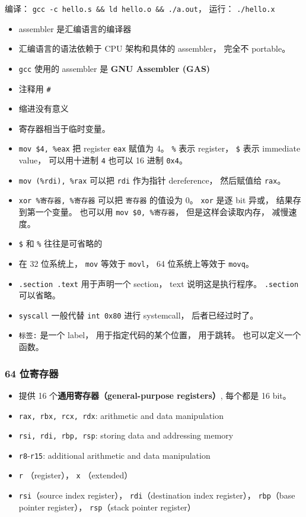 编译： \verb`gcc -c hello.s && ld hello.o && ./a.out`， 运行： \verb`./hello.x`
\begin{itemize}
\item assembler 是汇编语言的编译器
\item 汇编语言的语法依赖于 CPU 架构和具体的 assembler， 完全不 portable。
\item \verb`gcc` 使用的 assembler 是 \textbf{GNU Assembler (GAS)}
\item 注释用 \verb`#`
\item 缩进没有意义
\item 寄存器相当于临时变量。
\item \verb`mov $4, %eax` 把 register \verb`eax` 赋值为 4。 \verb`%` 表示 register， \verb`$` 表示 immediate value， 可以用十进制 \verb`4` 也可以 16 进制 \verb`0x4`。
\item \verb`mov (%rdi), %rax` 可以把 \verb`rdi` 作为指针 dereference， 然后赋值给 \verb`rax`。
\item \verb`xor %寄存器, %寄存器` 可以把 \verb`寄存器` 的值设为 0。 \verb`xor` 是逐 bit 异或， 结果存到第一个变量。 也可以用 \verb`mov $0, %寄存器`， 但是这样会读取内存， 减慢速度。
\item \verb`$` 和 \verb`%` 往往是可省略的
\item 在 32 位系统上， \verb`mov` 等效于 \verb`movl`， 64 位系统上等效于 \verb`movq`。
\item \verb`.section .text` 用于声明一个 section， text 说明这是执行程序。 \verb`.section` 可以省略。
\item \verb`syscall` 一般代替 \verb`int 0x80` 进行 systemcall， 后者已经过时了。
\item \verb`标签:` 是一个 label， 用于指定代码的某个位置， 用于跳转。 也可以定义一个函数。
\end{itemize}

\subsubsection{64 位寄存器}
\begin{itemize}
\item 提供 16 个\textbf{通用寄存器（general-purpose registers）}, 每个都是 16 bit。
\item \verb`rax, rbx, rcx, rdx`: arithmetic and data manipulation
\item \verb`rsi, rdi, rbp, rsp`: storing data and addressing memory
\item \verb`r8`-\verb`r15`: additional arithmetic and data manipulation
\item \verb`r` （register）， \verb`x` （extended）
\item \verb`rsi`（source index register）， \verb`rdi`（destination index register）， \verb`rbp`（base pointer register）， \verb`rsp`（stack pointer register）
\end{itemize}

